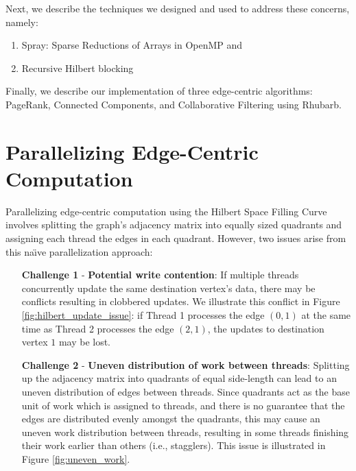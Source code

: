 Next, we describe the techniques we designed and used to address these concerns, namely:
\begin{enumerate}
    \item Spray: Sparse Reductions of Arrays in OpenMP \cite{spray} and 
    \item Recursive Hilbert blocking 
    
\end{enumerate}

Finally, we describe our implementation of three edge-centric algorithms: PageRank, Connected Components, and Collaborative Filtering using Rhubarb.



\section{Parallelizing Edge-Centric Computation}
Parallelizing edge-centric computation using the Hilbert Space Filling Curve involves splitting the graph's adjacency matrix into equally sized quadrants and assigning each thread the edges in each quadrant. However, two issues arise from this na\"{\i}ve  parallelization approach:


\begin{itemize}
    \item [\textbf{Challenge 1}] - \textbf{Potential write contention}: 
    If multiple threads concurrently update the same destination vertex's data, there 
    may be conflicts resulting in clobbered updates. We illustrate this conflict in Figure \ref{fig:hilbert_update_issue}: if Thread 1 processes the edge $(0, 1)$ at the same time as Thread 2 processes the edge $(2, 1)$, the updates to destination vertex $1$ may be lost.
    \item [\textbf{Challenge 2}] - \textbf{Uneven distribution of work between threads}: Splitting up the
    adjacency matrix into quadrants of equal side-length can lead to an uneven 
    distribution of edges between threads. Since quadrants act as the base unit of work which is assigned to threads, and there is no guarantee that the edges are distributed evenly amongst the quadrants, this may cause an uneven work distribution between threads, resulting in some threads finishing their work earlier than others (i.e., stagglers). This issue is illustrated in Figure 
    \ref{fig:uneven_work}.
\end{itemize}

